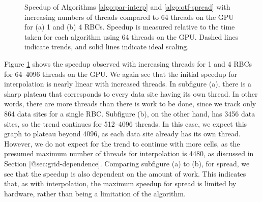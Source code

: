 \begin{figure}[ht]
\caption{%
    Speedup of Algorithms \ref{algo:par-interp} and \ref{algo:otf-spread} with
    increasing numbers of threads compared to 64 threads on the GPU for (a) 1
    and (b) 4 RBCs. Speedup is measured relative to the time taken for each
    algorithm using 64 threads on the GPU. Dashed lines indicate trends, and
    solid lines indicate ideal scaling.
}
\label{fig:str-strong}
\end{figure}

Figure \ref{fig:str-strong} shows the speedup observed with increasing threads
for 1 and 4 RBCs for 64--4096 threads on the GPU. We again see that the initial
speedup for interpolation is nearly linear with increased threads. In subfigure
(a), there is a sharp plateau that corresponds to every data site having its
own thread. In other words, there are more threads than there is work to be
done, since we track only 864 data sites for a single RBC. Subfigure (b), on
the other hand, has 3456 data sites, so the trend continues for 512--4096
threads. In this case, we expect this graph to plateau beyond 4096, as each
data site already has its own thread. However, we do not expect for the trend
to continue with more cells, as the presumed maximum number of threads for
interpolation is 4480, as discussed in Section [@sec:grid-dependence]. 
Comparing subfigure (a) to (b), for spread, we see that the speedup is also
dependent on the amount of work. This indicates that, as with interpolation,
the maximum speedup for spread is limited by hardware, rather than being a
limitation of the algorithm.

